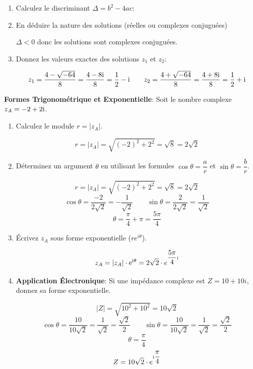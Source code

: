 \documentclass[11pt, a4paper]{report}
\begin{document}
\begin{enumerate}
    \item Calculez le discriminant $\Delta = b^2 - 4ac$: 
    \item En déduire la nature des solutions (réelles ou complexes conjuguées)
    \begin{blocvisible}[height=1]
        $\Delta < 0$ donc les solutions sont complexes conjuguées.
    \end{blocvisible}

    \item Donnez les valeurs exactes des solutions $z_1$ et $z_2$:
    \begin{blocvisible}[height=1.5]
        \[z_1 = \frac{4 - \sqrt{-64}}{8} = \frac{4 - 8\mathrm {i}}{8} = \frac{1}{2} - \mathrm {i} \qquad z_2 = \frac{4 + \sqrt{-64}}{8} = \frac{4 + 8\mathrm {i}}{8} = \frac{1}{2} + \mathrm {i}\]
    \end{blocvisible}
\end{enumerate}

\bigskip
\pagebreak
\thispagestyle{DS_LP}
 \medskip

\textbf{Formes Trigonométrique et Exponentielle}: 
Soit le nombre complexe $z_A = -2 + 2\mathrm {i}$. 

\begin{enumerate}
    \item Calculez le module $r = |z_A|$.
    
    \begin{blocvisible}[height=2]
        \[r = |z_A| = \sqrt{{(-2)}^2 + 2^2} = \sqrt{8} = 2\sqrt{2}\]
    \end{blocvisible}
    \item Déterminez un argument $\theta$ en utilisant les formules $\cos \theta = \dfrac{a}{r}$ et $\sin \theta = \dfrac{b}{r}$.
    \begin{blocvisible}[height=5]
        \[r = |z_A| = \sqrt{{(-2)}^2 + 2^2} = \sqrt{8} = 2\sqrt{2}\]
        \[\cos \theta = \frac{-2}{2\sqrt{2}} = -\frac{1}{\sqrt{2}} \qquad \sin \theta = \frac{2}{2\sqrt{2}} = \frac{1}{\sqrt{2}}\]
        \[\theta = \frac{\pi}{4} + \pi = \frac{5\pi}{4}\]       
    \end{blocvisible}
    \item Écrivez $z_A$ sous forme exponentielle ($r e^{i\theta}$).
    \begin{blocvisible}[height=2]
        \[z_A = |z_A| \cdot \mathrm{e}^{\mathrm {i}\theta}= 2\sqrt{2} \cdot e^{\dfrac{5\pi}{4}\mathrm {i}}\]
    \end{blocvisible}
    \item \textbf{Application Électronique}: Si une impédance complexe est $Z = 10 + 10i$, donnez sa forme exponentielle.
    \begin{blocvisible}[height=5]
        \[|Z| = \sqrt{10^2+10^2} = 10\sqrt{2}\]
        \[\cos \theta = \frac{10}{10\sqrt{2}}  = \frac{1}{\sqrt{2}} =\frac{\sqrt{2}}{2} \qquad \sin \theta = \frac{10}{10\sqrt{2}} = \frac{1}{\sqrt{2}}=\frac{\sqrt{2}}{2}\]
        \[\theta = \frac{\pi}{4}\]
        \[Z = 10\sqrt{2}\cdot e^{\mathrm {i}\dfrac{\pi}{4}}\]
    \end{blocvisible}   
\end{enumerate}
\end{document}
